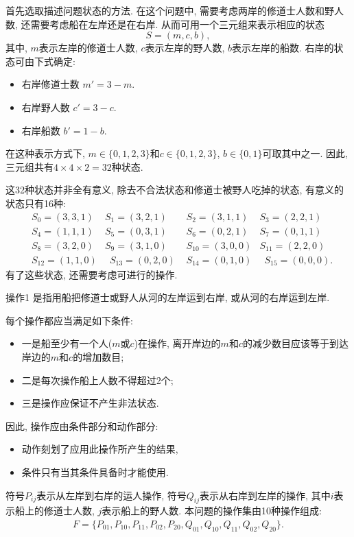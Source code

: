 \begin{result}
首先选取描述问题状态的方法. 在这个问题中, 需要考虑两岸的修道士人数和野人数, 还需要考虑船在左岸还是在右岸. 从而可用一个三元组来表示相应的状态
         $$S=(m, c, b),$$
其中, $m$表示左岸的修道士人数, $c$表示左岸的野人数, $b$表示左岸的船数.
右岸的状态可由下式确定:
\begin{itemize}
\item 右岸修道士数  $m'=3-m$.
\item 右岸野人数   $ c'=3-c$.
\item 右岸船数      $b'=1-b$.
\end{itemize}
在这种表示方式下, $m\in \{0,1,2,3\}$和$c\in \{0,1,2,3\}$, $b\in \{0,1\}$可取其中之一. 因此, 三元组共有$4\times 4\times 2=32$种状态.

这32种状态并非全有意义, 除去不合法状态和修道士被野人吃掉的状态, 有意义的状态只有16种:
\begin{align*}
        &S_0=(3, 3, 1)  &S_1=(3, 2, 1)     &\,\,S_2=(3, 1, 1)&S_3=(2, 2, 1)\\
        &S_4=(1, 1, 1)  &S_5=(0, 3, 1)     &\,\,S_6=(0, 2, 1)&S_7=(0, 1, 1)\\
        &S_8=(3, 2, 0)  &S_9=(3, 1, 0)     &\,\,S_{10}=(3, 0, 0)&S_{11}=(2, 2, 0)\\
        &S_{12}=(1, 1,0)&\,\,\,S_{13}=(0, 2, 0)  &\,\,S_{14}=(0, 1, 0)&\,\,\,S_{15}=(0, 0, 0).
\end{align*}
有了这些状态, 还需要考虑可进行的操作.

\begin{mydef}{操作}{1}
    是指用船把修道士或野人从河的左岸运到右岸, 或从河的右岸运到左岸.
\end{mydef}

每个操作都应当满足如下条件:
\begin{itemize}
\item 一是船至少有一个人($m$或$c$)在操作, 离开岸边的$m$和$c$的减少数目应该等于到达岸边的$m$和$c$的增加数目;
\item 二是每次操作船上人数不得超过2个;
\item 三是操作应保证不产生非法状态.
\end{itemize}
因此, 操作应由条件部分和动作部分:
\begin{itemize}
\item 动作刻划了应用此操作所产生的结果,
\item 条件只有当其条件具备时才能使用.
\end{itemize}
\begin{remark}
    符号$P_{ij}$表示从左岸到右岸的运人操作, 符号$Q_{ij}$表示从右岸到左岸的操作, 其中$i$表示船上的修道士人数, $j$表示船上的野人数.
本问题的操作集由10种操作组成:
\begin{align}
  F=\{P_{01}, P_{10}, P_{11}, P_{02}, P_{20},Q_{01}, Q_{10}, Q_{11}, Q_{02}, Q_{20}\}.
\end{align}
\end{remark}


\end{result}
